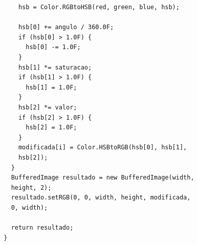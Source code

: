 \documentclass[	12pt, Times, openright, twoside, a4paper, english, brazil]{abntex2}
\begin{document}
\begin{apendicesenv}
\begin{lstlisting}
      hsb = Color.RGBtoHSB(red, green, blue, hsb);
      
      hsb[0] += angulo / 360.0F;
      if (hsb[0] > 1.0F) {
        hsb[0] -= 1.0F;
      }
      hsb[1] *= saturacao;
      if (hsb[1] > 1.0F) {
        hsb[1] = 1.0F;
      }
      hsb[2] *= valor;
      if (hsb[2] > 1.0F) {
        hsb[2] = 1.0F;
      }
      modificada[i] = Color.HSBtoRGB(hsb[0], hsb[1], 
      hsb[2]);
    }
    BufferedImage resultado = new BufferedImage(width, 
    height, 2);
    resultado.setRGB(0, 0, width, height, modificada, 
    0, width);
    
    return resultado;
  }
\end{lstlisting}

\end{apendicesenv}
\end{document}
